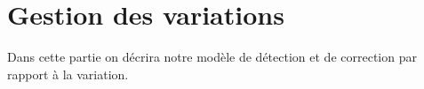 \chapter{Gestion des variations} %

\label{Chapitre3} %

Dans cette partie on décrira notre modèle de détection et de correction 
par rapport à la variation.